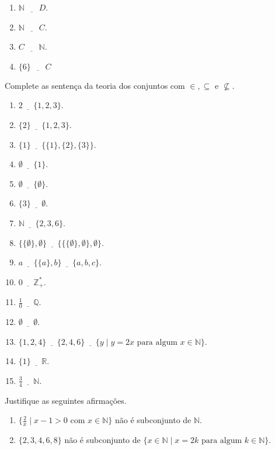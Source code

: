 \begin{problemset}
\begin{enumerate}
		\item $\mathbb{N} \ \underline{ \ \ \ \ \ \ } \ D$.
		\item $\mathbb{N} \ \underline{ \ \ \ \ \ \ } \ C$.
		\item $C \ \underline{ \ \ \ \ \ \ } \ \mathbb{N}$.
		\item $\{6\} \ \underline{ \ \ \ \ \ \ } \ C$
	\end{enumerate}
	\item Complete as sentença da teoria dos conjuntos com $\in, \subseteq$ e $\not\subseteq$.
	\begin{enumerate}
		\item $2 \underline{ \ \ \ \ \ \ } \{1, 2, 3\}$.
		\item $\{2\} \underline{ \ \ \ \ \ \ } \{1, 2, 3\}$.
		\item $\{1\} \underline{ \ \ \ \ \ \ } \{\{1\}, \{2\}, \{3\}\}$.
		\item $\emptyset \underline{ \ \ \ \ \ \ } \{1\}$.
		\item $\emptyset \underline{ \ \ \ \ \ \ } \{\emptyset\}$.
		\item $\{3\} \underline{ \ \ \ \ \ \ } \emptyset$.
		\item $\mathbb{N} \underline{ \ \ \ \ \ \ } \{2, 3, 6\}$.
		\item $\{\{\emptyset\}, \emptyset\} \underline{ \ \ \ \ \ \ } \{\{\{\emptyset\}, \emptyset\}, \emptyset\}$.
		\item $a \underline{ \ \ \ \ \ \ } \{\{a\}, b\} \underline{ \ \ \ \ \ \ } \{a, b, c\}$.
		\item $0 \underline{ \ \ \ \ \ \ }  \mathbb{Z}_+^*$.
		\item $\frac{1}{0} \underline{ \ \ \ \ \ \ }  \mathbb{Q}$.
		\item $\emptyset \underline{ \ \ \ \ \ \ }  \emptyset$.
		\item $\{1, 2, 4\} \underline{ \ \ \ \ \ \ }  \{2, 4, 6\} \underline{ \ \ \ \ \ \ } \{y \mid y = 2x \mbox{ para algum } x \in \mathbb{N}\}$.
		\item $\{1\} \underline{ \ \ \ \ \ \ }  \mathbb{R}$.
		\item $\frac{3}{4} \underline{ \ \ \ \ \ \ }  \mathbb{N}$.
	\end{enumerate}
	\item Justifique as seguintes afirmações.
	\begin{enumerate}
		\item $\{\frac{2}{x} \mid x - 1 > 0 \mbox{ com } x \in \mathbb{N}\}$ não é subconjunto de $\mathbb{N}$. 
		\item $\{2, 3, 4, 6, 8\}$ não é subconjunto de $\{x \in \mathbb{N} \mid  x = 2k \mbox{ para algum } k \in \mathbb{N}\}$.

\end{enumerate}
\end{problemset}
